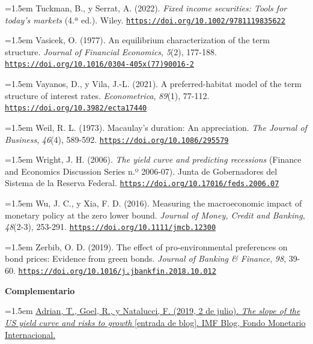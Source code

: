 \documentclass[10pt,a4paper]{article}
\begin{document}
\noindent\hangindent=1.5em Tuckman, B., y Serrat, A. (2022). \textit{Fixed income securities: Tools for today's markets} (4.ª ed.). Wiley. \href{https://doi.org/10.1002/9781119835622}{\nolinkurl{https://doi.org/10.1002/9781119835622}}

\noindent\hangindent=1.5em Vasicek, O. (1977). An equilibrium characterization of the term structure. \textit{Journal of Financial Economics}, \textit{5}(2), 177-188. \href{https://doi.org/10.1016/0304-405x(77)90016-2}{\nolinkurl{https://doi.org/10.1016/0304-405x(77)90016-2}}

\noindent\hangindent=1.5em Vayanos, D., y Vila, J.-L. (2021). A preferred-habitat model of the term structure of interest rates. \textit{Econometrica}, \textit{89}(1), 77-112. \href{https://doi.org/10.3982/ecta17440}{\nolinkurl{https://doi.org/10.3982/ecta17440}}

\noindent\hangindent=1.5em Weil, R. L. (1973). Macaulay's duration: An appreciation. \textit{The Journal of Business}, \textit{46}(4), 589-592. \href{https://doi.org/10.1086/295579}{\nolinkurl{https://doi.org/10.1086/295579}}

\noindent\hangindent=1.5em Wright, J. H. (2006). \textit{The yield curve and predicting recessions} (Finance and Economics Discussion Series n.º 2006-07). Junta de Gobernadores del Sistema de la Reserva Federal. \href{https://doi.org/10.17016/feds.2006.07}{\nolinkurl{https://doi.org/10.17016/feds.2006.07}}

\noindent\hangindent=1.5em Wu, J. C., y Xia, F. D. (2016). Measuring the macroeconomic impact of monetary policy at the zero lower bound. \textit{Journal of Money, Credit and Banking}, \textit{48}(2-3), 253-291. \href{https://doi.org/10.1111/jmcb.12300}{\nolinkurl{https://doi.org/10.1111/jmcb.12300}}

\noindent\hangindent=1.5em Zerbib, O. D. (2019). The effect of pro-environmental preferences on bond prices: Evidence from green bonds. \textit{Journal of Banking \& Finance}, \textit{98}, 39-60. \href{https://doi.org/10.1016/j.jbankfin.2018.10.012}{\nolinkurl{https://doi.org/10.1016/j.jbankfin.2018.10.012}}

\textbf{Complementario}

\noindent\hangindent=1.5em \href{https://www.imf.org/en/blogs/articles/2019/07/02/the-slope-of-the-us-yield-curve-and-risks-to-growth}{Adrian, T., Goel, R., y Natalucci, F. (2019, 2 de julio). \textit{The slope of the US yield curve and risks to growth} [entrada de blog]. IMF Blog, Fondo Monetario Internacional.}
\end{document}
